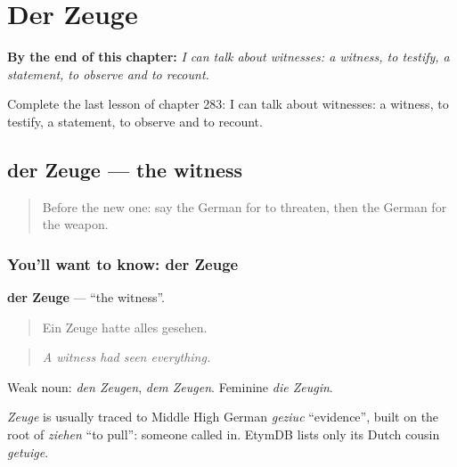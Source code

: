 
\chapter{Der Zeuge}
\label{ch:ge-der-zeuge}

\begin{chapteropening}
\textbf{By the end of this chapter:} \emph{I can talk about witnesses: a witness, to testify, a statement, to observe and to recount.}

Complete the last lesson of chapter 283: I can talk about witnesses: a witness, to testify, a statement, to observe and to recount.
\end{chapteropening}

\section[der Zeuge]{der Zeuge — the witness}

\label{lesson:GE-C283-zeuge}



\begin{quote}
Before the new one: say the German for to threaten, then the German for the weapon.
\end{quote}

\subsection*{You'll want to know: der Zeuge}
\textbf{der Zeuge} — \textquotedblleft{}the witness\textquotedblright{}.

\begin{quote}
Ein Zeuge hatte alles gesehen.
\end{quote}

\begin{quote}
\emph{A witness had seen everything.}
\end{quote}

Weak noun: \emph{den Zeugen}, \emph{dem Zeugen}. Feminine \emph{die Zeugin}.

\begin{cousinweb}
\emph{Zeuge} is usually traced to Middle High German \emph{geziuc} \textquotedblleft{}evidence\textquotedblright{}, built on the root of \emph{ziehen} \textquotedblleft{}to pull\textquotedblright{}: someone called in. EtymDB lists only its Dutch cousin \emph{getuige}.
\end{cousinweb}

